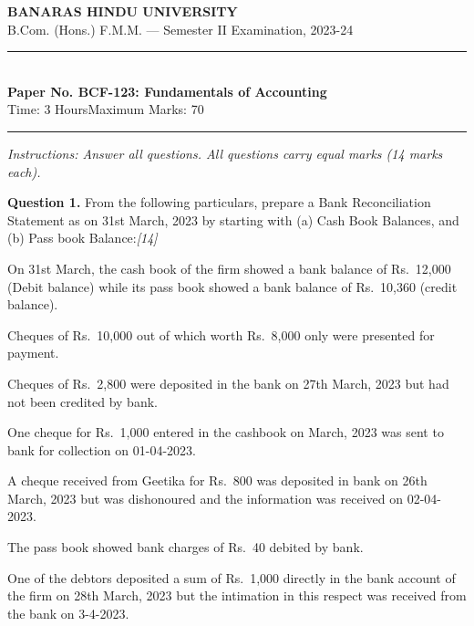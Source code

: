 \documentclass[11pt,a4paper]{article}
\newcommand{\pts}[1]{\hfill   \textit{[#1]}}
\begin{document}
\begin{center}
  {\large\bfseries BANARAS HINDU UNIVERSITY}\\[2pt]
  {\normalsize B.Com. (Hons.) F.M.M. --- Semester II Examination, 2023-24}\\[6pt]
  \rule{0.8\linewidth}{0.5pt}\\[6pt]
  {\large\bfseries Paper No. BCF-123: Fundamentals of Accounting}\\[4pt]
  {\normalsize Time: 3 Hours\hfill Maximum Marks: 70}
\end{center}

\rule{\linewidth}{0.4pt}

\smallskip



\noindent   \textit{Instructions: Answer all questions. All questions carry equal marks (14 marks each).}

\bigskip




\noindent   \textbf{Question 1.}
From the following particulars, prepare a Bank Reconciliation Statement as on 31st March, 2023 by starting with (a) Cash Book Balances, and (b) Pass book Balance:\pts{14}

\begin{parts}
  \item On 31st March, the cash book of the firm showed a bank balance of Rs.\ 12,000 (Debit balance) while its pass book showed a bank balance of Rs.\ 10,360 (credit balance).
  \item Cheques of Rs.\ 10,000 out of which worth Rs.\ 8,000 only were presented for payment.
  \item Cheques of Rs.\ 2,800 were deposited in the bank on 27th March, 2023 but had not been credited by bank.
  \item One cheque for Rs.\ 1,000 entered in the cashbook on March, 2023 was sent to bank for collection on 01-04-2023.
  \item A cheque received from Geetika for Rs.\ 800 was deposited in bank on 26th March, 2023 but was dishonoured and the information was received on 02-04-2023.
  \item The pass book showed bank charges of Rs.\ 40 debited by bank.
  \item One of the debtors deposited a sum of Rs.\ 1,000 directly in the bank account of the firm on 28th March, 2023 but the intimation in this respect was received from the bank on 3-4-2023.
\end{parts}
\end{document}
